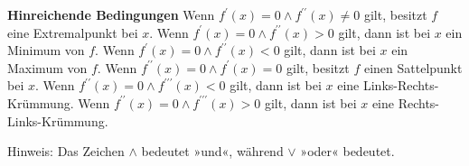 \documentclass[12pt]{article}
\begin{document}
				\begin{tcolorbox}[boxsep=0pt,top=.5cm,left=1cm,right=1cm, bottom=.4cm,arc=0pt,auto outer arc,colback=white,colframe=black, enlarge top by=.45cm, enlarge bottom by=.25cm]
					\textbf{Hinreichende Bedingungen}\newline\newline
					Wenn \colorbox{teal!30}{$f^{\prime}(x)=0\land f^{\prime\prime}(x)\neq 0$} gilt, besitzt $f$ eine \colorbox{teal!30}{Extremalpunkt} bei $x$.\newline\newline
					Wenn \colorbox{yellow!30}{$f^{\prime}(x)=0\land f^{\prime\prime}(x)>0$} gilt, dann ist bei $x$ ein \colorbox{yellow!30}{Minimum} von $f$.\newline\newline
					Wenn \colorbox{green!30}{$f^{\prime}(x)=0\land f^{\prime\prime}(x)<0$} gilt, dann ist bei $x$ ein \colorbox{green!30}{Maximum} von $f$.\newline\newline\newline
					Wenn \colorbox{violet!30}{$f^{\prime\prime}(x)=0\land f^{\prime}(x)=0$} gilt, besitzt $f$ einen \colorbox{violet!30}{Sattelpunkt} bei $x$.\newline\newline
					Wenn \colorbox{purple!30}{$f^{\prime\prime}(x)=0\land f^{\prime\prime\prime}(x)<0$} gilt, dann ist bei $x$ eine \colorbox{purple!30}{Links-Rechts-Krümmung.}\newline\newline
					Wenn \colorbox{orange!30}{$f^{\prime\prime}(x)=0\land f^{\prime\prime\prime}(x)>0$} gilt, dann ist bei $x$ eine \colorbox{orange!30}{Rechts-Links-Krümmung.}
				\end{tcolorbox}
				\noindent Hinweis: Das Zeichen $\land$ bedeutet »und«, während $\lor$ »oder« bedeutet.
\end{document}
